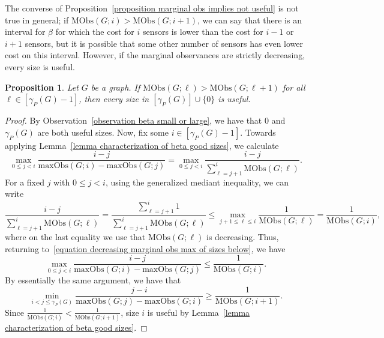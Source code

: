 \documentclass{article}
\newtheorem{proposition}[theorem]{Proposition}
\begin{document}
        The converse of Proposition~\ref{proposition marginal obs implies not useful} is not true in general; if $\mathrm{MObs}(G;i)>\mathrm{MObs}(G;i+1)$, we can say that there is an interval for $\beta$ for which the cost for $i$ sensors is lower than the cost for $i-1$ or $i+1$ sensors, but it is possible that some other number of sensors has even lower cost on this interval.
        However, if the marginal observances are strictly decreasing, every size is useful.
        \begin{proposition}
            Let $G$ be a graph.
            If $\mathrm{MObs}(G;\ell)>\mathrm{MObs}(G;\ell+1)$ for all $\ell\in [\gamma_P(G)-1]$, then every size in $[\gamma_P(G)]\cup \{0\}$ is useful.
        \end{proposition}
        \begin{proof}
            By Observation~\ref{observation beta small or large}, we have that $0$ and $\gamma_P(G)$ are both useful sizes.
            Now, fix some $i\in [\gamma_P(G)-1]$.
            Towards applying Lemma~\ref{lemma characterization of beta good sizes}, we calculate
            \begin{equation}\label{equation decreasing marginal obs max of sizes below}
                \max_{0\leq j<i}\frac{i-j}{\mathrm{maxObs}(G;i)-\mathrm{maxObs}(G;j)}=\max_{0\leq j<i}\frac{i-j}{\sum_{\ell=j+1}^i\mathrm{MObs}(G;\ell)}.
            \end{equation}
            For a fixed $j$ with $0\leq j<i$, using the generalized mediant inequality, we can write
                \[ \frac{i-j}{\sum_{\ell=j+1}^i\mathrm{MObs}(G;\ell)}=\frac{\sum_{\ell=j+1}^i1}{\sum_{\ell=j+1}^i\mathrm{MObs}(G;\ell)}\leq \max_{j+1\leq \ell\leq i}\frac{1}{\mathrm{MObs}(G;\ell)}=\frac{1}{\mathrm{MObs}(G;i)}, \]
            where on the last equality we use that $\mathrm{MObs}(G;\ell)$ is decreasing.
            Thus, returning to~\eqref{equation decreasing marginal obs max of sizes below}, we have
                \[ 
                \max_{0\leq j<i}\frac{i-j}{\mathrm{maxObs}(G;i)-\mathrm{maxObs}(G;j)} \leq \frac{1}{\mathrm{MObs}(G;i)}. 
                \]
            By essentially the same argument, we have that
                \[ 
                \min_{i<j\leq \gamma_P(G)}\frac{j-i}{\mathrm{maxObs}(G;j)-\mathrm{maxObs}(G;i)} \geq \frac{1}{\mathrm{MObs}(G;i+1)}. 
                \]
            Since $\frac{1}{\mathrm{MObs}(G;i)}<\frac{1}{\mathrm{MObs}(G;i+1)}$, size $i$ is useful by Lemma~\ref{lemma characterization of beta good sizes}.
        \end{proof}
    
\end{document}
